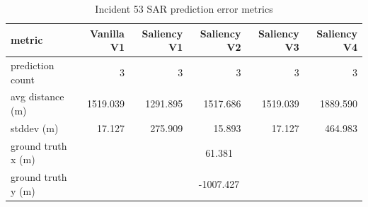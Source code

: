 \begin{table}[ht]
\centering
\caption{Incident 53 SAR prediction error metrics}
\label{tab:sar-incident-53}
\begin{tabular}{lrrrrr}
\hline
metric & Vanilla V1 & Saliency V1 & Saliency V2 & Saliency V3 & Saliency V4 \\
\hline
prediction count & 3 & 3 & 3 & 3 & 3 \\
avg distance (m) & 1519.039 & 1291.895 & 1517.686 & 1519.039 & 1889.590 \\
stddev (m) & 17.127 & 275.909 & 15.893 & 17.127 & 464.983 \\
ground truth x (m) & \multicolumn{5}{c}{61.381} \\
ground truth y (m) & \multicolumn{5}{c}{-1007.427} \\
\hline
\end{tabular}
\end{table}
